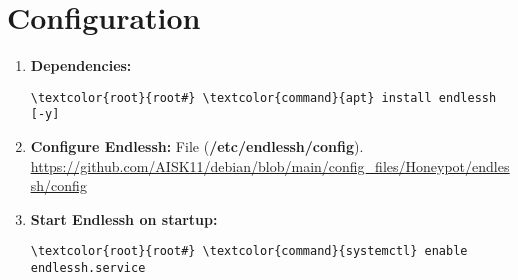 \documentclass[10pt, a4paper, onecolumn, openany]{book} %
\begin{document}
\section{Configuration}
\begin{enumerate}
    \item \textbf{Dependencies:}
\begin{Verbatim}[commandchars=\\\{\}]
\textcolor{root}{root#} \textcolor{command}{apt} install endlessh [-y]
\end{Verbatim}
    \item \textbf{Configure Endlessh:}
\newline File (\textbf{\textcolor{file}{/etc/endlessh/config}}).
\newline \underline{\url{https://github.com/AISK11/debian/blob/main/config_files/Honeypot/endlessh/config}}
    \item \textbf{Start Endlessh on startup:}
\begin{Verbatim}[commandchars=\\\{\}]
\textcolor{root}{root#} \textcolor{command}{systemctl} enable endlessh.service
\end{Verbatim}
\end{enumerate}
\end{document}
